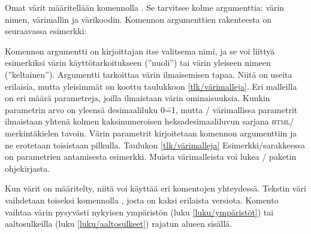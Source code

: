 
Omat värit määritellään komennolla . Se tarvitsee
kolme argumenttia: värin nimen, värimallin ja värikoodin. Komennon
argumenttien rakenteesta on seuraavassa esimerkki:

\begin{koodilohkosis}
\end{koodilohkosis}

Komennon argumentti  on kirjoittajan itse valitsema nimi,
ja se voi liittyä esimerkiksi värin käyttötarkoitukseen (''nuoli'') tai
värin yleiseen nimeen (''keltainen''). Argumentti 
tarkoittaa värin ilmaisemisen tapaa. Niitä on useita erilaisia, mutta
yleisimmät on koottu taulukkoon \ref{tlk/värimalleja}. Eri malleilla on
eri määrä parametreja, joilla ilmaistaan värin ominaisuuksia. Kunkin
parametrin arvo on yleensä desimaaliluku 0\==1, mutta \-/
värimallissa parametrit ilmaistaan yhtenä kolmen kaksinumeroisen
heksadesimaaliluvun sarjana \textsc{html}\-/ merkintäkielen tavoin.
Värin parametrit kirjoitetaan komennon argumenttiin
 ja ne erotetaan toisistaan pilkulla. Taulukon
\ref{tlk/värimalleja} Esimerkki\-/sarakkeessa on parametrien antamisesta
esimerkki. Muista värimalleista voi lukea \-/ paketin
ohjekirjasta.

Kun värit on määritelty, niitä voi käyttää eri komentojen yhteydessä.
Tekstin väri vaihdetaan toiseksi komennolla , josta on
kaksi erilaista versiota. Komento vaihtaa värin pysyvästi nykyisen
ympäristön (luku \ref{luku/ympäristöt}) tai aaltosulkeilla (luku
\ref{luku/aaltosulkeet}) rajatun alueen sisällä.

